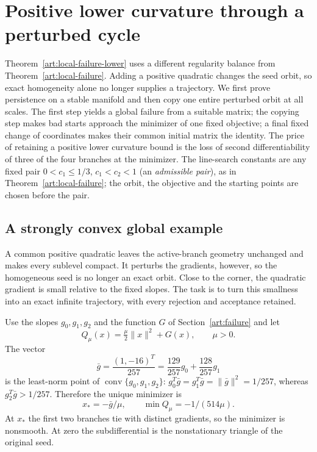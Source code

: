 \section{Positive lower curvature through a perturbed cycle}
\label{art:lower_curvature}

Theorem~\ref{art:local-failure-lower} uses a different regularity balance
from Theorem~\ref{art:local-failure}. Adding a positive quadratic changes
the seed orbit, so exact homogeneity alone no longer supplies a trajectory.
We first prove persistence on a stable manifold and then copy one entire
perturbed orbit at all scales. The first step yields a global failure
from a suitable matrix; the copying step makes bad starts approach the
minimizer of one fixed objective; a final fixed change of coordinates
makes their common initial matrix the identity. The price of retaining
a positive lower curvature bound is the loss of second differentiability
of three of the four branches at the minimizer. The line-search constants are any
fixed pair $0<c_1\le1/3$, $c_1<c_2<1$ (an \emph{admissible pair}), as in
Theorem~\ref{art:local-failure};
the orbit, the objective and the starting points are chosen before the pair.

\subsection{A strongly convex global example}
A common positive quadratic leaves the active-branch geometry unchanged
and makes every sublevel compact. It perturbs the gradients, however, so
the homogeneous seed is no longer an exact orbit. Close to the corner,
the quadratic gradient is small relative to the fixed slopes. The task
is to turn this smallness into an exact infinite trajectory, with every
rejection and acceptance retained.

Use the slopes $g_0,g_1,g_2$ and the function $G$ of Section~\ref{art:failure} and let
\[
 Q_\mu(x)=\tfrac\mu2\|x\|^2+G(x),\qquad\mu>0.
\]
The vector
\[
 \bar g=\frac{(1,-16)^T}{257}
        =\frac{129}{257}g_0+\frac{128}{257}g_1
\]
is the least-norm point of $\operatorname{conv}\{g_0,g_1,g_2\}$:
$g_0^T\bar g=g_1^T\bar g=\|\bar g\|^2=1/257$, whereas
$g_2^T\bar g>1/257$. Therefore the unique minimizer is
\begin{equation}\label{art:quadratic_minimizer}
 x_*=-\bar g/\mu,\qquad \min Q_\mu=-1/(514\mu).
\end{equation}
At $x_*$ the first two branches tie with distinct gradients, so the
minimizer is nonsmooth. At zero the subdifferential is the nonstationary
triangle of the original seed.

